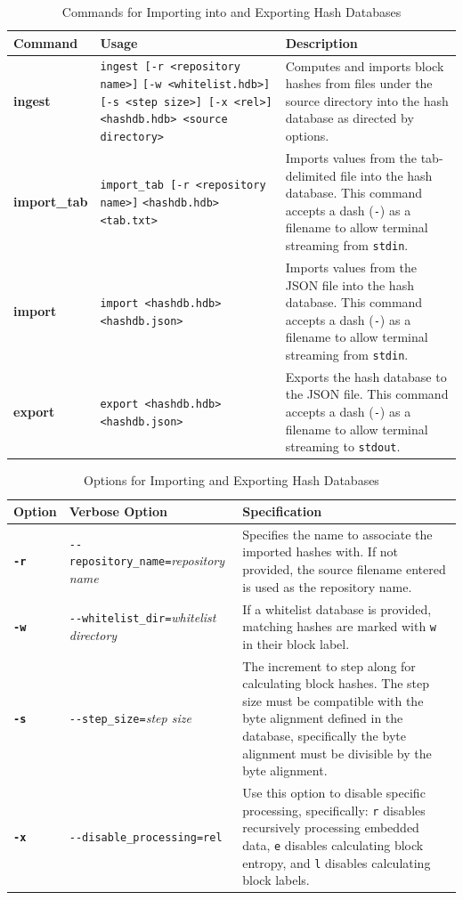 \documentclass[11pt,fleqn]{article} %
\begin{document}
\begin{table}[!ht]
\centering
\caption{Commands for Importing into and Exporting Hash Databases}
\label{tab:importExport}
\begin{tabular}{|p{2.5 cm}|p{7 cm}|p{4 cm}|}
\hline \hline
\textbf{Command} & \textbf{Usage} & \textbf{Description} \\
\hline
\textbf{ingest} & \verb+ingest [-r <repository name>]+ \verb+[-w <whitelist.hdb>]+ \verb+[-s <step size>] [-x <rel>]+ \verb+ <hashdb.hdb> <source directory>+& Computes and imports block hashes from files under the source directory into the hash database as directed by options.\\
\hline
\textbf{import\_tab} & \verb+import_tab [-r <repository name>]+ \verb+<hashdb.hdb>+ \verb+<tab.txt>+& Imports values from the tab-delimited file into the hash database. This command accepts a dash (\verb+-+) as a filename to allow terminal streaming from \verb+stdin+.\\
\hline
\textbf{import} & \verb+import <hashdb.hdb>+ \verb+<hashdb.json>+& Imports values from the JSON file into the hash database. This command accepts a dash (\verb+-+) as a filename to allow terminal streaming from \verb+stdin+.\\
\hline
\textbf{export} & \verb+export <hashdb.hdb>+ \verb+<hashdb.json>+& Exports the hash database to the JSON file. This command accepts a dash (\verb+-+) as a filename to allow terminal streaming to \verb+stdout+.\\
\hline
\end{tabular}
\end{table}

\begin{table}[!ht]
\centering
\caption{Options for Importing and Exporting Hash Databases}
\label{tab:ImportExportOptions}
\begin{tabular}{|p{1.5 cm}|p{8 cm}|p{4 cm}|}
\hline \hline
\textbf{Option} & \textbf{Verbose Option} & \textbf{Specification} \\
\hline
\textbf{\texttt{-r}} & \verb+--repository_name=+\textit{repository name} & Specifies the name to associate the imported hashes with. If not provided, the source filename entered is used as the repository name.\\
\hline
\textbf{\texttt{-w}} & \verb+--whitelist_dir=+\textit{whitelist directory} & If a whitelist database is provided, matching hashes are marked with \verb+w+ in their block label.\\
\hline
\textbf{\texttt{-s}} & \verb+--step_size=+\textit{step size} & The increment to step along for calculating block hashes. The step size must be compatible with the byte alignment defined in the database, specifically the byte alignment must be divisible by the byte alignment.\\
\hline
\textbf{\texttt{-x}} & \verb+--disable_processing=rel+ & Use this option to disable specific processing, specifically: \verb+r+ disables recursively processing embedded data, \verb+e+ disables calculating block entropy, and \verb+l+ disables calculating block labels.\\
\hline
\end{tabular}
\end{table}
\end{document}
